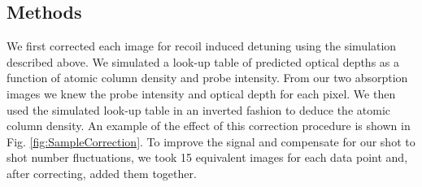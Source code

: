 \documentclass[12pt]{iopart}
\begin{document}
\subsection{Methods}
\par We first corrected each image for recoil induced detuning using the simulation described above. We simulated a look-up table of predicted optical depths as a function of atomic column density and probe intensity. From our two absorption images we knew the probe intensity and optical depth for each pixel. We then used the simulated look-up table in an inverted fashion to deduce the atomic column density. An example of the effect of this correction procedure is shown in Fig. \ref{fig:SampleCorrection}.  To improve the signal and compensate for our shot to shot number fluctuations, we took 15 equivalent images for each data point and, after correcting, added them together.
\end{document}
